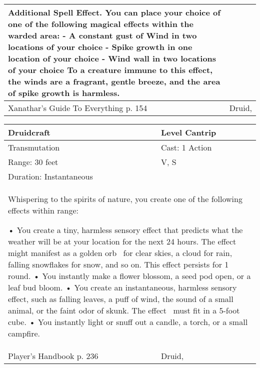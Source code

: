 \documentclass[11pt]{report}
\begin{document}
\begin{table}[H]
\begin{tabular}{||p{6cm}|p{6cm}||}
{Additional Spell Effect. You can place your choice of one of the following magical effects within the warded area: 
- A constant gust of Wind in two locations of your choice
- Spike growth in one location of your choice
- Wind wall in two locations of your choice
To a creature immune to this effect, the winds are a fragrant, gentle breeze, and the area of spike growth is harmless.}\\ \hline
Xanathar's Guide To Everything p. 154 & Druid, \\ \hline\hline
	\end{tabular}
\end{table}

\begin{table}[H]
	\begin{tabular}{||p{6cm}|p{6cm}||}
		\hline\hline
		\bf{Druidcraft} & Level Cantrip\\ \hline
		Transmutation & Cast: 1 Action\\ \hline
		Range: 30 feet & V, S\\ \hline
		Duration: Instantaneous & \\ \hline
		\multicolumn{2}{||p{12cm}||}{Whispering to the spirits of nature, you create one of the following effects within range: 

• You create a tiny, harmless sensory effect that predicts what the weather will be at your location for the next 24 hours. The effect might manifest as a golden orb  for clear skies, a cloud for rain, falling snowflakes for snow, and so on. This effect persists for 1 round. 
• You instantly make a flower blossom, a seed pod open, or a leaf bud bloom. 
• You create an instantaneous, harmless sensory effect, such as falling leaves, a puff of wind, the sound of a small animal, or the faint odor of skunk. The effect  must fit in a 5-foot cube. 
• You instantly light or snuff out a candle, a torch, or a small campfire.}\\ \hline
Player's Handbook p. 236 & Druid, \\ \hline\hline
	\end{tabular}
\end{table}
\end{document}

